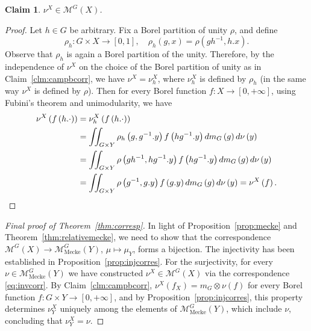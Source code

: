 \documentclass{amsart}
\numberwithin{equation}{subsection}
\newtheorem{claim}[thm]{Claim}
\theoremstyle{remark}
\begin{document}
\begin{claim}
\(\nu^{X}\in\mathcal{M}^{G}\left(X\right)\).
\end{claim}

\begin{proof}
Let \(h\in G\) be arbitrary. Fix a Borel partition of unity \(\rho\), and define
\[\rho_{h}:G\times X\longrightarrow\left[0,1\right],\quad\rho_{h}\left(g,x\right)=\rho\left(gh^{-1},h.x\right).\]
Observe that \(\rho_{h}\) is again a Borel partition of the unity. Therefore, by the independence of \(\nu^{X}\) on the choice of the Borel partition of unity as in Claim~\ref{clm:campbcorr}, we have \(\nu^{X}=\nu_{h}^{X}\), where \(\nu_{h}^{X}\) is defined by \(\rho_{h}\) (in the same way \(\nu^{X}\) is defined by \(\rho\)). Then for every Borel function \(f:X\to\left[0,+\infty\right]\), using Fubini's theorem and unimodularity, we have
\begin{align*}
\nu^{X}\left(f\left(h.\cdot\right)\right)
&=\nu_{h}^{X}\left(f\left(h.\cdot\right)\right)\\
&=\iint\nolimits_{G\times Y}\rho_{h}\left(g,g^{-1}.y\right)f\left(hg^{-1}.y\right)dm_{G}\left(g\right)d\nu\left(y\right)\\
&=\iint\nolimits_{G\times Y}\rho\left(gh^{-1},hg^{-1}.y\right)f\left(hg^{-1}.y\right)dm_{G}\left(g\right)d\nu\left(y\right)\\
&=\iint\nolimits_{G\times Y}\rho\left(g^{-1},g.y\right)f\left(g.y\right)dm_{G}\left(g\right)d\nu\left(y\right)=\nu^{X}\left(f\right).\qedhere
\end{align*}
\end{proof}

\begin{proof}[Final proof of Theorem~\ref{thm:corresp}]
In light of Proposition~\ref{prop:mecke} and Theorem~\ref{thm:relativemecke}, we need to show that the correspondence \(\mathcal{M}^{G}\left(X\right)\to\mathcal{M}_{\mathrm{Mecke}}^{G}\left(Y\right)\), \(\mu\mapsto\mu_{Y}\), forms a bijection. The injectivity has been established in Proposition~\ref{prop:injcorres}. For the surjectivity, for every \(\nu\in\mathcal{M}_{\mathrm{Mecke}}^{G}\left(Y\right)\) we have constructed \(\nu^{X}\in\mathcal{M}^{G}\left(X\right)\) via the correspondence \eqref{eq:invcorr}. By Claim~\ref{clm:campbcorr}, \(\nu^{X}\left(f_{X}\right)=m_{G}\otimes\nu\left(f\right)\) for every Borel function \(f:G\times Y\to\left[0,+\infty\right]\), and by Proposition~\ref{prop:injcorres}, this property determines \(\nu_{Y}^{X}\) uniquely among the elements of \(\mathcal{M}_{\mathrm{Mecke}}^{G}\left(Y\right)\), which include \(\nu\), concluding that \(\nu_{Y}^{X}=\nu\).
\end{proof}
\end{document}
